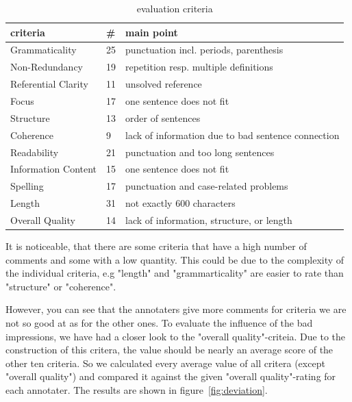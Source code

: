 \begin{table}[H]
	\begin{tabularx}{\textwidth}{llX} \toprule
		criteria & \# & main point \\ \midrule
		Grammaticality      & 25 & punctuation incl. periods, parenthesis  \\
		Non-Redundancy      & 19 & repetition resp. multiple definitions \\
		Referential Clarity & 11 & unsolved reference \\
		Focus               & 17 & one sentence does not fit \\
		Structure           & 13 & order of sentences \\
		Coherence           & 9  & lack of information due to bad sentence connection \\
		Readability         & 21 & punctuation and too long sentences \\
		Information Content & 15 & one sentence does not fit \\
		Spelling            & 17 & punctuation and case-related problems \\
		Length              & 31 & not exactly 600 characters \\
		Overall Quality     & 14 & lack of information, structure, or length \\ \bottomrule
	\end{tabularx}
	\caption{evaluation criteria}
	\label{tab:evacomments}
\end{table}

It is noticeable, that there are some criteria that have a high number of comments and some with a low quantity.
This could be due to the complexity of the individual criteria, e.g "length" and "grammarticality" are easier to rate than "structure" or "coherence".

However, you can see that the annotaters give more comments for criteria we are not so good at as for the other ones.
To evaluate the influence of the bad impressions, we have had a closer look to the "overall quality"-criteia.
Due to the construction of this critera, the value should be nearly an average score of the other ten criteria.
So we calculated every average value of all critera (except "overall quality") and compared it against the given "overall quality"-rating for each annotater.
The results are shown in figure~\ref{fig:deviation}.


